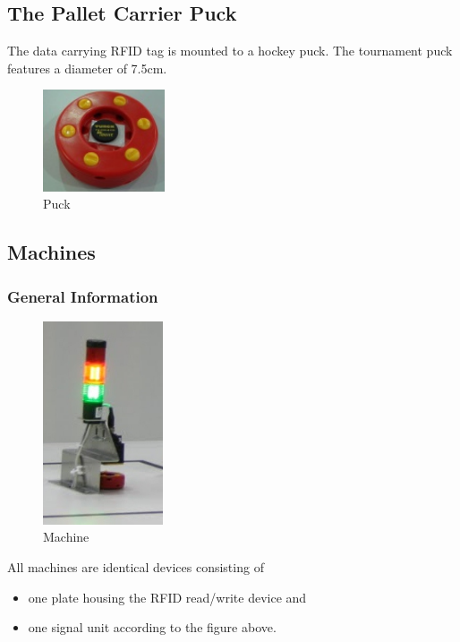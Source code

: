 \documentclass[12pt,twoside]{article}
\begin{document}
\subsection{The Pallet Carrier Puck}
The data carrying RFID tag is mounted to a hockey puck. The tournament
puck features a diameter of 7.5cm.

\begin{figure}[h!]
  \centering
  \includegraphics[height=3cm]{125px-Puck}
  \caption{Puck}
  \label{fig:puck}
\end{figure}

\subsection{Machines}
\label{sec:machines}

\subsubsection{General Information}

\begin{figure}[h]
  \centering
  \includegraphics[height=6cm]{Machine}
  \caption{Machine}
  \label{fig:machine}
\end{figure}

All machines are identical devices consisting of 
\begin{itemize}
\item one plate housing the RFID read/write device and
\item one signal unit according to the figure above.
\end{itemize}
\end{document}
